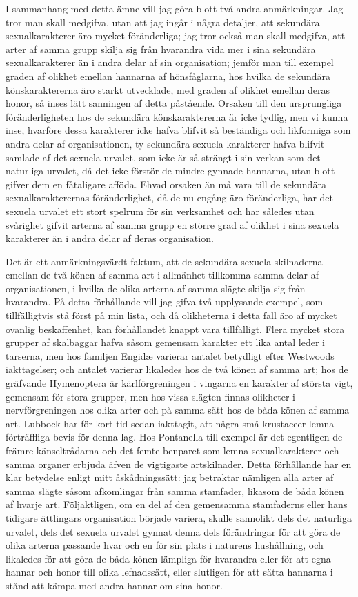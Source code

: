 I sammanhang med detta ämne vill jag göra blott två andra anmärkningar. Jag tror man skall medgifva, utan att jag ingår i några detaljer, att sekundära sexualkarakterer äro mycket föränderliga; jag tror också man skall medgifva, att arter af samma grupp skilja sig från hvarandra vida mer i sina sekundära sexualkarakterer än i andra delar af sin organisation; jemför man till exempel graden af olikhet emellan hannarna af hönsfåglarna, hos hvilka de sekundära könskaraktererna äro starkt utvecklade, med graden af olikhet emellan deras honor, så inses lätt sanningen af detta påstående. Orsaken till den ursprungliga föränderligheten hos de sekundära könskaraktererna är icke tydlig, men vi kunna inse, hvarföre dessa karakterer icke hafva blifvit så beständiga och likformiga som andra delar af organisationen, ty sekundära sexuela karakterer hafva blifvit samlade af det sexuela urvalet, som icke är så strängt i sin verkan som det naturliga urvalet, då det icke förstör de mindre gynnade hannarna, utan blott gifver dem en fåtaligare afföda. Ehvad orsaken än må vara till de sekundära sexualkarakterernas föränderlighet, då de nu engång äro föränderliga, har det sexuela urvalet ett stort spelrum för sin verksamhet och har således utan svårighet gifvit arterna af samma grupp en större grad af olikhet i sina sexuela karakterer än i andra delar af deras organisation.

Det är ett anmärkningsvärdt faktum, att de sekundära sexuela skilnaderna emellan de två könen af samma art i allmänhet tillkomma samma delar af organisationen, i hvilka de olika arterna af samma slägte skilja sig från hvarandra. På detta förhållande vill jag gifva två upplysande exempel, som tillfälligtvis stå först på min lista, och då olikheterna i detta fall äro af mycket ovanlig beskaffenhet, kan förhållandet knappt vara tillfälligt. Flera mycket stora grupper af skalbaggar hafva såsom gemensam karakter ett lika antal leder i tarserna, men hos familjen Engidæ varierar antalet betydligt efter Westwoods iakttagelser; och antalet varierar likaledes hos de två könen af samma art; hos de gräfvande Hymenoptera är kärlförgreningen i vingarna en karakter af största vigt, gemensam för stora grupper, men hos vissa slägten finnas olikheter i nervförgreningen hos olika arter och på samma sätt hos de båda könen af samma art. Lubbock har för kort tid sedan iakttagit, att några små krustaceer lemna förträffliga bevis för denna lag. Hos Pontanella till exempel är det egentligen de främre känseltrådarna och det femte benparet som lemna sexualkarakterer och samma organer erbjuda äfven de vigtigaste artskilnader. Detta förhållande har en klar betydelse enligt mitt åskådningssätt: jag betraktar nämligen alla arter af samma slägte såsom afkomlingar från samma stamfader, likasom de båda könen af hvarje art. Följaktligen, om en del af den gemensamma stamfaderns eller hans tidigare ättlingars organisation började variera, skulle sannolikt dels det naturliga urvalet, dels det sexuela urvalet gynnat denna dels förändringar för att göra de olika arterna passande hvar och en för sin plats i naturens hushållning, och likaledes för att göra de båda könen lämpliga för hvarandra eller för att egna hannar och honor till olika lefnadssätt, eller slutligen för att sätta hannarna i stånd att kämpa med andra hannar om sina honor.

